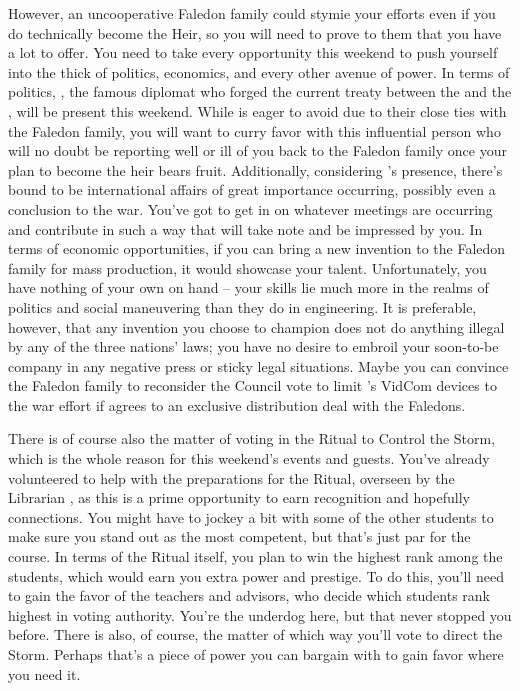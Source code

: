 \documentclass[char]{GL2020}
\begin{document}
However, an uncooperative Faledon family could stymie your efforts even if you do technically become the Heir, so you will need to prove to them that you have a lot to offer. You need to take every opportunity this weekend to push yourself into the thick of politics, economics, and every other avenue of power. In terms of politics, \cDiplomat{}, the famous diplomat who forged the current treaty between the \pTech{} and the \pFarm{}, will be present this weekend. While \cHeir{} is eager to avoid \cDiplomat{\them} due to their close ties with the Faledon family, you will want to curry favor with this influential person who will no doubt be reporting well or ill of you back to the Faledon family once your plan to become the heir bears fruit. Additionally, considering \cDiplomat{}'s presence, there's bound to be international affairs of great importance occurring, possibly even a conclusion to the war. You've got to get in on whatever meetings are occurring and contribute in such a way that \cDiplomat{} will take note and be impressed by you. In terms of economic opportunities, if you can bring a new invention to the Faledon family for mass production, it would showcase your talent. Unfortunately, you have nothing of your own on hand – your skills lie much more in the realms of politics and social maneuvering than they do in engineering. It is preferable, however, that any invention you choose to champion does not do anything illegal by any of the three nations' laws; you have no desire to embroil your soon-to-be company in any negative press or sticky legal situations. Maybe you can convince the Faledon family to reconsider the Council vote to limit \cTechStar{\full}'s VidCom devices to the war effort if \cTechStar{} agrees to an exclusive distribution deal with the Faledons.

There is of course also the matter of voting in the Ritual to Control the Storm, which is the whole reason for this weekend's events and guests. You've already volunteered to help with the preparations for the Ritual, overseen by the Librarian \cLibrarian{\full}, as this is a prime opportunity to earn recognition and hopefully connections. You might have to jockey a bit with some of the other students to make sure you stand out as the most competent, but that's just par for the course. In terms of the Ritual itself, you plan to win the highest rank among the \pTech{} students, which would earn you extra power and prestige. To do this, you'll need to gain the favor of the teachers and advisors, who decide which students rank highest in voting authority. You're the underdog here, but that never stopped you before. There is also, of course, the matter of which way you'll vote to direct the Storm. Perhaps that's a piece of power you can bargain with to gain favor where you need it.
\end{document}
